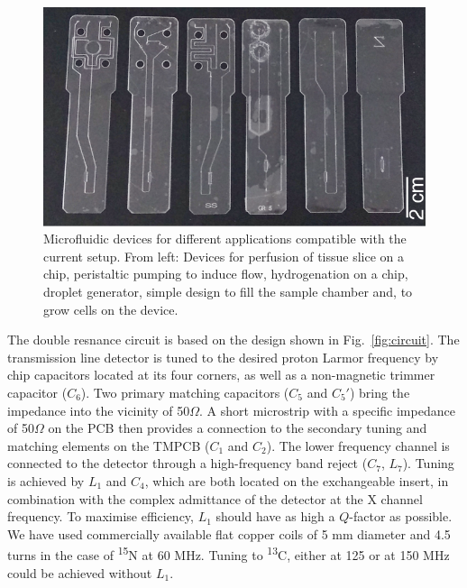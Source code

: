 \documentclass[preprint,5p]{elsarticle}
\newcommand{\fig}[1]{Fig.~\ref{#1}}
\begin{document}
\begin{figure}
\centering
\includegraphics[width=.7\linewidth,keepaspectratio=true]{./figures/ms5n17-tlp-im-181007-devices.png} 
\caption{Microfluidic devices for different applications compatible with the current setup. 
From left: Devices for perfusion of tissue slice on a chip, peristaltic pumping to induce flow, 
hydrogenation on a chip, droplet generator, simple design to fill the sample chamber and, 
to grow cells on the device.}
\label{fig:device} 
\end{figure}

The double resnance circuit is based on the design shown in \fig{fig:circuit}. 
The transmission line detector is tuned to the desired proton 
Larmor frequency by chip capacitors located at its four corners, 
as well as a non-magnetic trimmer capacitor ($C_6$). Two primary 
matching capacitors ($C_5$ and $C_5'$) bring the impedance into the 
vicinity of 50$\Omega$. A short microstrip 
with a specific impedance of 50$\Omega$ 
on the PCB then provides a connection to the secondary tuning and matching elements on the TMPCB ($C_1$ and $C_2$).
The lower frequency channel is connected to the detector through a high-frequency band reject ($C_7$, $L_7$).
Tuning is achieved by $L_1$ and $C_4$, which are both located on the exchangeable insert, in combination with
the complex admittance of the detector at the X channel frequency.
To maximise efficiency, $L_1$ should have as high a $Q$-factor as possible. We have
used commercially available flat copper coils of 5 mm diameter and 4.5 turns in the case of 
\textsuperscript{15}N at 60 MHz. Tuning to \textsuperscript{13}C, either at 125 or at 150 MHz 
could be achieved without $L_1$. 
\end{document}
